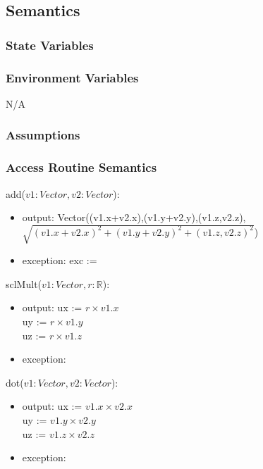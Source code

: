 \documentclass[12pt, titlepage]{article}
\begin{document}
\subsection{Semantics}
\subsubsection{State Variables}

\subsubsection{Environment Variables}
N/A

\subsubsection{Assumptions}

\subsubsection{Access Routine Semantics}
\noindent add($v1:Vector, v2:Vector$):
\begin{itemize}
	\item output: 
	Vector((v1.x+v2.x),(v1.y+v2.y),(v1.z,v2.z), \\
	$\sqrt{(v1.x+v2.x)^2+(v1.y+v2.y)^2+(v1.z,v2.z)^2}$)
	\item exception: exc := \\
\end{itemize}

\noindent sclMult($v1:Vector, r:\mathbb{R}$):
\begin{itemize}
	\item output: 
	ux := $r \times v1.x$ \\
	uy := $r \times v1.y$ \\
	uz := $r \times v1.z$ \\	
	\item exception: \\
\end{itemize}


\noindent dot($v1:Vector, v2:Vector$):
\begin{itemize}
	\item output: 
	ux := $v1.x \times v2.x$ \\
	uy := $v1.y \times v2.y$ \\
	uz := $v1.z \times v2.z$ \\
	\item exception: \\
\end{itemize}
\end{document}
